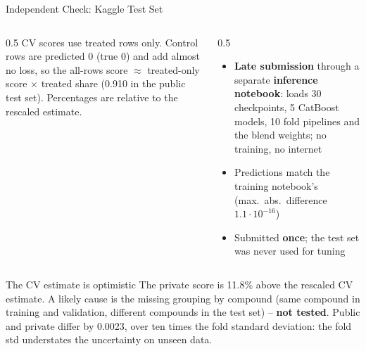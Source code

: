 \documentclass[9pt,aspectratio=169]{beamer}
\begin{document}
\begin{frame}{Independent Check: Kaggle Test Set}
\begin{columns}[T]
\begin{column}{0.5\textwidth}
      \vspace{2mm}
      \scriptsize CV scores use treated rows only. Control rows are predicted 0 (true 0) and add almost no loss, so the all-rows score $\approx$ treated-only score $\times$ treated share (0.910 in the public test set). Percentages are relative to the rescaled estimate.
    \end{column}
    \begin{column}{0.5\textwidth}
      \begin{itemize}
        \item \textbf{Late submission} through a separate \textbf{inference notebook}: loads 30 checkpoints, 5 CatBoost models, 10 fold pipelines and the blend weights; no training, no internet
        \item Predictions match the training notebook's (max.\ abs.\ difference $1.1\cdot10^{-16}$)
        \item Submitted \textbf{once}; the test set was never used for tuning
      \end{itemize}
    \end{column}
  \end{columns}
  \vspace{2mm}
  \begin{alertblock}{The CV estimate is optimistic}
    \small The private score is 11.8\% above the rescaled CV estimate. A likely cause is the missing grouping by compound (same compound in training and validation, different compounds in the test set) -- \textbf{not tested}. Public and private differ by 0.0023, over ten times the fold standard deviation: the fold std understates the uncertainty on unseen data.
  \end{alertblock}
\end{frame}
\end{document}
